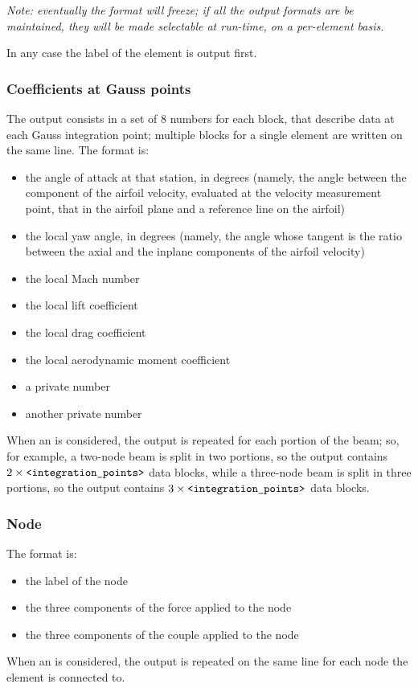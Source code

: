 \noindent
\emph{Note: eventually the format will freeze; if all the output formats
are be maintained, they will be made selectable at run-time,
on a per-element basis.}

\noindent
In any case the label of the element is output first.

\subsubsection{Coefficients at Gauss points}
The output consists in a set of 8 numbers for each block,
that describe data at each Gauss integration point;
multiple blocks for a single element are written on the same line.
The format is:
\begin{itemize}
    \item the angle of attack at that station, in degrees 
	(namely, the angle between the component of the airfoil velocity,
	evaluated at the velocity measurement point, that in the airfoil
	plane and a reference line on the airfoil)
    \item the local yaw angle, in degrees
	(namely, the angle whose tangent is the ratio
	between the axial and the inplane components of the airfoil
	velocity)
    \item the local Mach number
    \item the local lift coefficient
    \item the local drag coefficient
    \item the local aerodynamic moment coefficient
    \item a private number
    \item another private number
\end{itemize}
When an  is considered, the output 
is repeated for each portion of the beam; so, for example,
a two-node beam is split in two portions, so the output
contains $2\times \texttt{<integration\_points>}$ data blocks,
while a three-node beam is split in three portions,
so the output contains $3\times \texttt{<integration\_points>}$ data blocks.

\subsubsection{Node}
The format is:
\begin{itemize}
    \item the label of the node
    \item the three components of the force applied to the node
    \item the three components of the couple applied to the node
\end{itemize}
When an  is considered, the output is repeated 
on the same line for each node the element is connected to.

